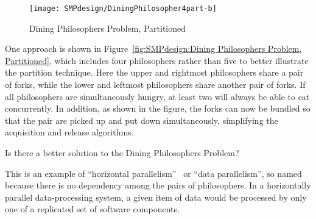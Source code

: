 \begin{figure}[tb]
\begin{center}
\texttt{[image: SMPdesign/DiningPhilosopher4part-b]}
\end{center}
\caption{Dining Philosophers Problem, Partitioned}
\end{figure}

One approach is shown in
Figure~\ref{fig:SMPdesign:Dining Philosophers Problem, Partitioned},
which includes four philosophers rather than five to better illustrate the
partition technique.
Here the upper and rightmost philosophers share a pair of forks,
while the lower and leftmost philosophers share another pair of forks.
If all philosophers are simultaneously hungry, at least two will
always be able to eat concurrently.
In addition, as shown in the figure, the forks can now be bundled
so that the pair are picked up and put down simultaneously, simplifying
the acquisition and release algorithms.

\QuickQuiz{}
	Is there a better solution to the Dining
	Philosophers Problem?
 \QuickQuizEnd

This is an example of ``horizontal parallelism''~\cite{Inman85}
or ``data parallelism'',
so named because there is no dependency among the pairs of philosophers.
In a horizontally parallel data-processing system, a given item of data
would be processed by only one of a replicated set of software
components.

